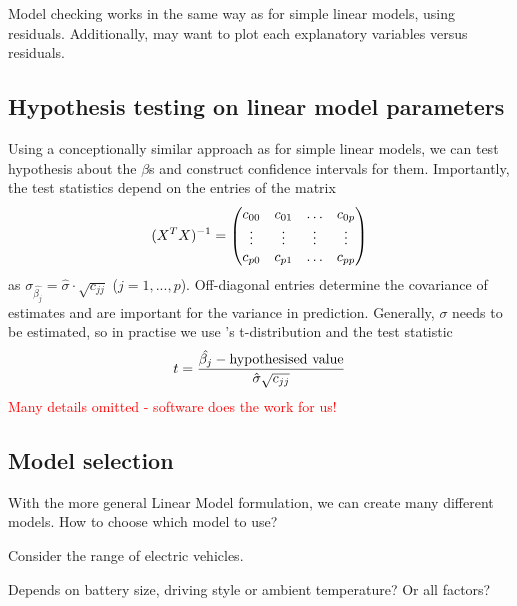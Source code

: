 Model checking works in the same way as for simple linear models, using residuals. Additionally, may want to plot each explanatory variables versus residuals.

\subsection{Hypothesis testing on linear model parameters}

Using a conceptionally similar approach as for simple linear models, we can test hypothesis about the $\beta$s and construct confidence intervals for them. Importantly, the test statistics depend on the entries of the matrix
\begin{align}
	(X^TX)^{-1} = \begin{pmatrix}
		c_{00} & c_{01} & \dots & c_{0p} \\ \vdots & \vdots & \vdots & \vdots \\ c_{p0} & c_{p1} & \dots & c_{pp}
	\end{pmatrix}\notag
\end{align}
as $\sigma_{\hat{\beta_j}}=\hat{\sigma}\cdot\sqrt{c_{jj}}$ ($j=1,...,p$). Off-diagonal entries determine the covariance of estimates and are important for the variance in prediction. Generally, $\sigma$ needs to be estimated, so in practise we use 's t-distribution and the test statistic
\begin{align}
	t = \frac{\hat{\beta_j}-\text{hypothesised value}}{\hat{\sigma}\sqrt{c_{jj}}} \notag
\end{align}
\textcolor{red}{Many details omitted - software does the work for us!}

\subsection{Model selection}

With the more general Linear Model formulation, we can create many different models. How to choose which model to use?

\begin{example}
	Consider the range of electric vehicles.
	\begin{center}
	\end{center}
	Depends on battery size, driving style or ambient temperature? Or all factors?
\end{example}

